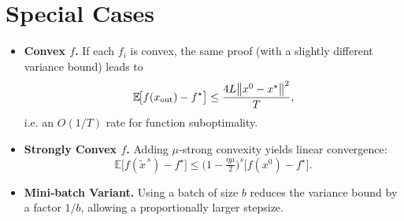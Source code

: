 \documentclass[11pt]{article}
\newcommand{\E}{\mathbb{E}}
\begin{document}
\section*{Special Cases}
\begin{itemize}
  \item \textbf{Convex $f$.} If each $f_i$ is convex, the same proof (with a slightly different variance bound) leads to
  \[
  \E\!\bigl[f(x_{\rm out})-f^{\star}\bigr]\le
  \frac{4L\bigl\|x^{0}-x^{\star}\bigr\|^{2}}{T},
  \]
  i.e. an $O(1/T)$ rate for function suboptimality.
  \item \textbf{Strongly Convex $f$.} Adding $\mu$‑strong convexity yields linear convergence:
  \[
  \E\!\bigl[f(\tilde{x}^{\,s})-f^{\star}\bigr]\le\bigl(1-\tfrac{\eta\mu}{2}\bigr)^{s}\bigl[f(x^{0})-f^{\star}\bigr].
  \]
  \item \textbf{Mini‑batch Variant.} Using a batch of size $b$ reduces the variance bound by a factor $1/b$, allowing a proportionally larger stepsize.
\end{itemize}
\end{document}
